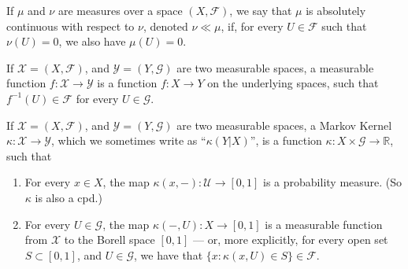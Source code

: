 \documentclass[twoside]{article} %
\theoremstyle{plain}
\theoremstyle{definition}
\begin{document}
    \begin{defn}
        If $\mu$ and $\nu$ are measures over a space $(X, \mathcal F)$, 
        we say that $\mu$ is absolutely continuous with respect to $\nu$, denoted $\nu \ll \mu$, if, for every $U \in \mathcal F$ such that $\nu(U) = 0$, we also have $\mu(U) = 0$. 
    \end{defn}
    
    \begin{defn}
        If $\mathcal X  = (X, \mathcal F)$, and $\mathcal Y = (Y, \mathcal G)$ are two measurable spaces, a measurable function $f : \mathcal X \to \mathcal Y$ is a function $f: X \to Y$ on the underlying spaces, such that 
        $f^{-1}(U) \in \mathcal F$ for every $U \in \mathcal G$.
    \end{defn}
    
    \begin{defn}
        If $\mathcal X  = (X, \mathcal F)$, and $\mathcal Y = (Y, \mathcal G)$ are two measurable spaces, a Markov Kernel $\kappa : \mathcal X \to \mathcal Y$, which we sometimes write as ``$\kappa(Y|X)$'', is a function $\kappa : X \times \mathcal G \to \mathbb R$, such that
        \begin{enumerate}
            \item For every $x \in X$, the map $\kappa(x, -) : \mathcal U \to [0,1]$ is a probability measure. (So $\kappa$ is also a cpd.)
            \item For every $U \in \mathcal G$, the map $\kappa(-, U) : X \to [0,1]$ is a measurable function from $\mathcal X$ to the Borell space $[0,1]$
            --- or, more explicitly, for every open set $S \subset [0,1]$, and $U \in \mathcal G$, we have that
            $\{x : \kappa(x,U) \in S\} \in \mathcal F$. 
    \end{enumerate}
    \end{defn}
    
\end{document}
